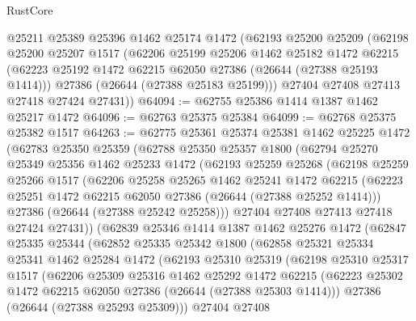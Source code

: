 \begin{lexlean}{RustCore}
\begin{coremodule}
    @25211
    @25389
    @25396
    @1462
    @25174
    @1472
    (@62193
      @25200
      @25209
      (@62198
        @25200
        @25207
        @1517
        (@62206
          @25199
          @25206
          @1462
          @25182
          @1472
          @62215
          (@62223 @25192 @1472 @62215 @62050 @27386 (@26644 (@27388 @25193 @1414)))
          @27386
          (@26644 (@27388 @25183 @25199)))
        @27404
        @27408
        @27413
        @27418
        @27424
        @27431))
@64094 := @62755 @25386 @1414 @1387 @1462 @25217 @1472
@64096 := @62763 @25375 @25384
@64099 := @62768 @25375 @25382 @1517
@64263 := @62775
    @25361
    @25374
    @25381
    @1462
    @25225
    @1472
    (@62783
      @25350
      @25359
      (@62788
        @25350
        @25357
        @1800
        (@62794
          @25270
          @25349
          @25356
          @1462
          @25233
          @1472
          (@62193
            @25259
            @25268
            (@62198
              @25259
              @25266
              @1517
              (@62206
                @25258
                @25265
                @1462
                @25241
                @1472
                @62215
                (@62223 @25251 @1472 @62215 @62050 @27386 (@26644 (@27388 @25252 @1414)))
                @27386
                (@26644 (@27388 @25242 @25258)))
              @27404
              @27408
              @27413
              @27418
              @27424
              @27431))
          (@62839
            @25346
            @1414
            @1387
            @1462
            @25276
            @1472
            (@62847
              @25335
              @25344
              (@62852
                @25335
                @25342
                @1800
                (@62858
                  @25321
                  @25334
                  @25341
                  @1462
                  @25284
                  @1472
                  (@62193
                    @25310
                    @25319
                    (@62198
                      @25310
                      @25317
                      @1517
                      (@62206
                        @25309
                        @25316
                        @1462
                        @25292
                        @1472
                        @62215
                        (@62223 @25302 @1472 @62215 @62050 @27386 (@26644 (@27388 @25303 @1414)))
                        @27386
                        (@26644 (@27388 @25293 @25309)))
                      @27404
                      @27408

\end{coremodule}
\end{lexlean}
